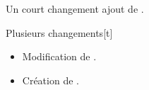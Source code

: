 \begin{doctopic}{Un court changement}
    ajout de .
\end{doctopic}

\begin{doctopic}{Plusieurs changements}[t] %
    \begin{itemize}
        \item Modification de .
        \item Création de .
    \end{itemize}
\end{doctopic}

